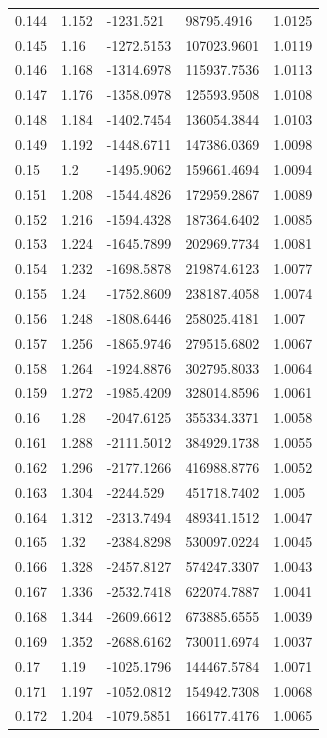 \begin{tabular}{lllll}
0.144 & 1.152 & -1231.521 & 98795.4916 & 1.0125 \\
0.145 & 1.16 & -1272.5153 & 107023.9601 & 1.0119 \\
0.146 & 1.168 & -1314.6978 & 115937.7536 & 1.0113 \\
0.147 & 1.176 & -1358.0978 & 125593.9508 & 1.0108 \\
0.148 & 1.184 & -1402.7454 & 136054.3844 & 1.0103 \\
0.149 & 1.192 & -1448.6711 & 147386.0369 & 1.0098 \\
0.15 & 1.2 & -1495.9062 & 159661.4694 & 1.0094 \\
0.151 & 1.208 & -1544.4826 & 172959.2867 & 1.0089 \\
0.152 & 1.216 & -1594.4328 & 187364.6402 & 1.0085 \\
0.153 & 1.224 & -1645.7899 & 202969.7734 & 1.0081 \\
0.154 & 1.232 & -1698.5878 & 219874.6123 & 1.0077 \\
0.155 & 1.24 & -1752.8609 & 238187.4058 & 1.0074 \\
0.156 & 1.248 & -1808.6446 & 258025.4181 & 1.007 \\
0.157 & 1.256 & -1865.9746 & 279515.6802 & 1.0067 \\
0.158 & 1.264 & -1924.8876 & 302795.8033 & 1.0064 \\
0.159 & 1.272 & -1985.4209 & 328014.8596 & 1.0061 \\
0.16 & 1.28 & -2047.6125 & 355334.3371 & 1.0058 \\
0.161 & 1.288 & -2111.5012 & 384929.1738 & 1.0055 \\
0.162 & 1.296 & -2177.1266 & 416988.8776 & 1.0052 \\
0.163 & 1.304 & -2244.529 & 451718.7402 & 1.005 \\
0.164 & 1.312 & -2313.7494 & 489341.1512 & 1.0047 \\
0.165 & 1.32 & -2384.8298 & 530097.0224 & 1.0045 \\
0.166 & 1.328 & -2457.8127 & 574247.3307 & 1.0043 \\
0.167 & 1.336 & -2532.7418 & 622074.7887 & 1.0041 \\
0.168 & 1.344 & -2609.6612 & 673885.6555 & 1.0039 \\
0.169 & 1.352 & -2688.6162 & 730011.6974 & 1.0037 \\
0.17 & 1.19 & -1025.1796 & 144467.5784 & 1.0071 \\
0.171 & 1.197 & -1052.0812 & 154942.7308 & 1.0068 \\
0.172 & 1.204 & -1079.5851 & 166177.4176 & 1.0065 \\

\end{tabular}
